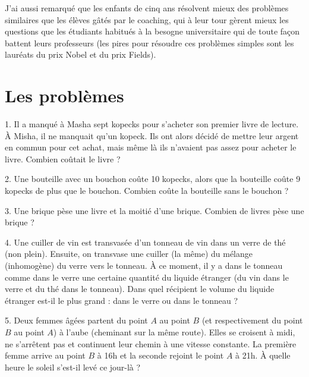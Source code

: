 J'ai aussi remarqué que les enfants de cinq ans résolvent mieux des problèmes similaires que les élèves gâtés
par le coaching, qui à leur tour gèrent mieux les questions que les étudiants
habitués à la besogne universitaire qui de toute façon battent leurs professeurs (les pires pour résoudre ces problèmes simples sont
les lauréats du prix Nobel et du prix Fields).
\clearpage
\section*{Les problèmes}

\begin{problem}{1.}
	Il a manqué à Masha sept kopecks pour s'acheter son premier livre de lecture.
	À Misha, il ne manquait qu'un kopeck.
	Ils ont alors décidé de mettre leur argent en commun pour cet achat, mais même là ils
	n'avaient pas assez pour acheter le livre.
	Combien coûtait le livre ?
\end{problem}

\begin{problem}{2.}
	Une bouteille avec un bouchon coûte 10 kopecks, alors que la bouteille coûte 9 kopecks de
	plus que le bouchon.
	Combien coûte la bouteille sans le bouchon ?
\end{problem}

\begin{problem}{3.}
	Une brique pèse une livre et la moitié d'une brique. Combien de livres pèse une brique ?
\end{problem}

\begin{problem}{4.}
	Une cuiller de vin est transvasée d'un tonneau de vin dans un verre de thé (non plein).
	Ensuite, on transvase une cuiller (la même) du mélange (inhomogène) du verre vers le tonneau.
	À ce moment, il y a dans le tonneau comme dans le verre une certaine quantité du liquide étranger
	(du vin dans le verre et du thé dans le tonneau).
	Dans quel récipient le volume du liquide étranger est-il le plus grand : dans le verre ou dans
	le tonneau ?
\end{problem}

\begin{problem}{5.}
	Deux femmes âgées partent du point $A$ au point $B$ (et respectivement du point $B$ au point $A$)
	à l'aube (cheminant sur la même route).
	Elles se croisent à midi, ne s'arrêtent pas et continuent leur chemin à une vitesse constante.
	La première femme arrive au point $B$ à 16h et la seconde rejoint le point $A$ à 21h.
	À quelle heure le soleil s'est-il levé ce jour-là ?
\end{problem}

